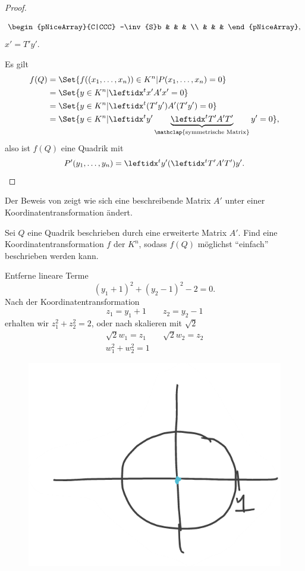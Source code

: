 \begin{proof}
\begin{bemerkung*}
\begin{equation*}
\begin{pNiceArray}{C|CCC}
         -\inv{S}b & & & \\
         & & &
      \end{pNiceArray},
    \end{equation*}
    \dh \( x'=T'y' \).
  \end{bemerkung*}
  Es gilt
  \begin{equation*}
    \begin{split}
      f(Q)&=\Set{f((x_1,\dotsc,x_n))\in K^n| P(x_1,\dotsc,x_n)=0}\\
      &=\Set{y\in K^n| \transpose{x'}A'x'=0}\\
      &=\Set{y\in K^n| \transpose{(T'y')}A'(T'y')=0}\\
      &=\Set{y\in K^n| \transpose{y'}\underbrace{\transpose{T'}A'T'}_{\mathclap{\text{symmetrische Matrix}}}y'=0},
    \end{split}
  \end{equation*}
  also ist \( f(Q) \) eine Quadrik mit
  \begin{equation*}
    P'(y_1,\dotsc, y_n)=\transpose{y'}(\transpose{T'}A'T')y'.
  \end{equation*}
\end{proof}
\begin{bemerkung*}
  Der Beweis von  zeigt wie sich eine beschreibende Matrix \( A' \) unter einer Koordinatentransformation ändert.
\end{bemerkung*}
\begin{frage*}
  Sei \( Q \) eine Quadrik beschrieben durch eine erweiterte Matrix \( A' \). Find eine Koordinatentransformation \( f \) der \( K^n \), sodass \( f(Q) \) möglichst \enquote{einfach} beschrieben werden kann.
\end{frage*}
Entferne lineare Terme
\begin{equation*}
  (y_1+1)^2+(y_2-1)^2-2=0.
\end{equation*}
Nach der Koordinatentransformation
\begin{equation*}
  z_1=y_1+1\qquad z_2=y_2-1
\end{equation*}
erhalten wir \( z_1^2+z_2^2=2 \), oder nach skalieren mit \( \sqrt{2} \)
\begin{gather*}
  \sqrt{2}w_1= z_1\qquad \sqrt{2}w_2=z_2\\
  w_1^2+w_2^2=1
\end{gather*}
\begin{figure}[H]
  \centering
  \includegraphics[width=0.5\linewidth]{figures/vereinfachte_quadrik}
  \label{fig:vereinfachte_quadrik}
\end{figure}
